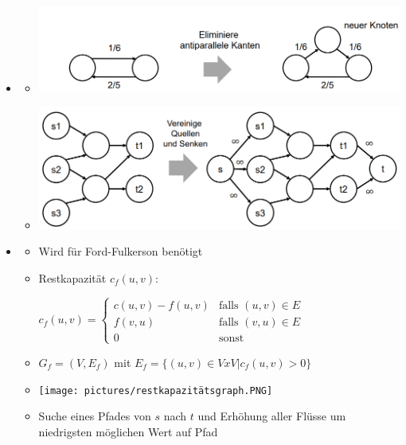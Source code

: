 \documentclass[
    12pt,
    a4paper,
    ngerman,
    color=3b,%
    marginpar=false,
    colorback=false,
    leqno,
]{tudaexercise}
\begin{document}
\begin{itemize}
        \item {}
            \begin{itemize}
                \item[] \includegraphics[width=12cm]{pictures/flussTrans1.PNG}
                \item[] \includegraphics[width=12cm]{pictures/flussTrans2.PNG}
            \end{itemize}
\clearpage
        \item {}
            \begin{itemize}
                \item Wird für Ford-Fulkerson benötigt
                \item Restkapazität $c_f(u,v)$: \\
                        \centerline{$c_f(u,v) = \begin{cases}
                                                c(u,v) - f(u,v) & \text{falls $(u,v) \in E$} \\
                                                f(v,u) & \text{falls $(v,u) \in E$} \\
                                                0 & \text{sonst}
                                                \end{cases}$}
                \item $G_f = (V, E_f)$ mit $E_f = \{(u,v) \in V x V | c_f(u,v) > 0 \}$
                \item[] \texttt{[image: pictures/restkapazitätsgraph.PNG]}
                \item Suche eines Pfades von $s$ nach $t$ und Erhöhung aller Flüsse um niedrigsten möglichen Wert auf Pfad
            \end{itemize}



\end{itemize}
\end{document}

